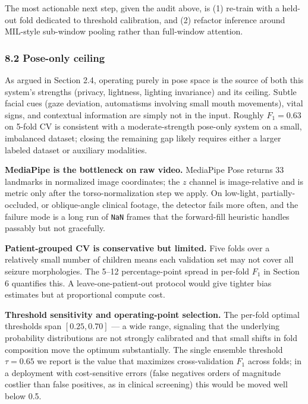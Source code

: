 \documentclass[
  11pt,
]{article}
\begin{document}
The most actionable next step, given the audit above, is (1) re-train
with a held-out fold dedicated to threshold calibration, and (2)
refactor inference around MIL-style sub-window pooling rather than
full-window attention.

\subsubsection{8.2 Pose-only ceiling}\label{pose-only-ceiling}

As argued in Section 2.4, operating purely in pose space is the source
of both this system's strengths (privacy, lightness, lighting
invariance) and its ceiling. Subtle facial cues (gaze deviation,
automatisms involving small mouth movements), vital signs, and
contextual information are simply not in the input. Roughly
\(F_1{=}0.63\) on 5-fold CV is consistent with a moderate-strength
pose-only system on a small, imbalanced dataset; closing the remaining
gap likely requires either a larger labeled dataset or auxiliary
modalities.

\textbf{MediaPipe is the bottleneck on raw video.} MediaPipe Pose
returns 33 landmarks in normalized image coordinates; the \(z\) channel
is image-relative and is metric only after the torso-normalization step
we apply. On low-light, partially-occluded, or oblique-angle clinical
footage, the detector fails more often, and the failure mode is a long
run of \texttt{NaN} frames that the forward-fill heuristic handles
passably but not gracefully.

\textbf{Patient-grouped CV is conservative but limited.} Five folds over
a relatively small number of children means each validation set may not
cover all seizure morphologies. The 5--12 percentage-point spread in
per-fold \(F_1\) in Section 6 quantifies this. A leave-one-patient-out
protocol would give tighter bias estimates but at proportional compute
cost.

\textbf{Threshold sensitivity and operating-point selection.} The
per-fold optimal thresholds span \([0.25, 0.70]\) --- a wide range,
signaling that the underlying probability distributions are not strongly
calibrated and that small shifts in fold composition move the optimum
substantially. The single ensemble threshold \(\tau = 0.65\) we report
is the value that maximizes cross-validation \(F_1\) across folds; in a
deployment with cost-sensitive errors (false negatives orders of
magnitude costlier than false positives, as in clinical screening) this
would be moved well below 0.5.
\end{document}
